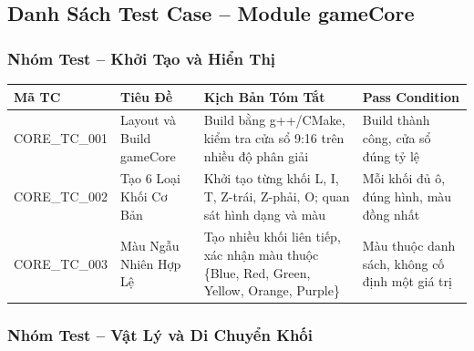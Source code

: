 \documentclass[12pt,a4paper]{article}
\begin{document}
\subsection{Danh Sách Test Case -- Module gameCore}


\subsubsection{Nhóm Test -- Khởi Tạo và Hiển Thị}

\begin{table}[H]
\centering
{}
\begin{tabularx}{\linewidth}{|l|X|X|X|}
\hline
\rowcolor{gray!35}
\textbf{Mã TC} & \textbf{Tiêu Đề} & \textbf{Kịch Bản Tóm Tắt} & \textbf{Pass Condition} \\ \hline
CORE\_TC\_001 & Layout và Build gameCore     & Build bằng g++/CMake, kiểm tra cửa sổ 9:16 trên nhiều độ phân giải & Build thành công, cửa sổ đúng tỷ lệ \\ \hline
CORE\_TC\_002 & Tạo 6 Loại Khối Cơ Bản       & Khởi tạo từng khối L, I, T, Z-trái, Z-phải, O; quan sát hình dạng và màu & Mỗi khối đủ ô, đúng hình, màu đồng nhất \\ \hline
CORE\_TC\_003 & Màu Ngẫu Nhiên Hợp Lệ        & Tạo nhiều khối liên tiếp, xác nhận màu thuộc \{Blue, Red, Green, Yellow, Orange, Purple\} & Màu thuộc danh sách, không cố định một giá trị \\ \hline
\end{tabularx}
\end{table}

\subsubsection{Nhóm Test -- Vật Lý và Di Chuyển Khối}
\end{document}
